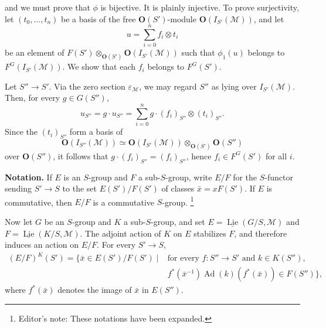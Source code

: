 and we must prove that \(\phi\) is bijective. It is plainly injective.
To prove surjectivity, let \((t_0,\ldots,t_n)\) be a basis of the free
\(\mathbf O(S')\)-module \(\mathbf O(I_{S'}(\mathscr M))\), and let
\[
 u=\sum_{i=0}^{n}f_i\otimes t_i
\]
be an element of
\(F(S')\otimes_{\mathbf O(S')}\mathbf O(I_{S'}(\mathscr M))\) such
that \(\phi_1(u)\) belongs to \(F^G(I_{S'}(\mathscr M))\). We show that
each \(f_i\) belongs to \(F^G(S')\).

Let \(S''\to S'\). Via the zero section \(\varepsilon_{\mathscr M}\),
we may regard \(S''\) as lying over \(I_{S'}(\mathscr M)\). Then, for
every \(g\in G(S'')\),
\[
 u_{S''}=g\cdot u_{S''}
   =\sum_{i=0}^{n}g\cdot(f_i)_{S''}\otimes(t_i)_{S''}.
\]
Since the \((t_i)_{S''}\) form a basis of
\[
 \mathbf O(I_{S''}(\mathscr M))
 \simeq \mathbf O(I_{S'}(\mathscr M))
        \otimes_{\mathbf O(S')}\mathbf O(S'')
\]
over \(\mathbf O(S'')\), it follows that
\(g\cdot(f_i)_{S''}=(f_i)_{S''}\), hence \(f_i\in F^G(S')\) for all
\(i\).

\medskip
\noindent\textbf{Notation.}
If \(E\) is an \(S\)-group and \(F\) a sub-\(S\)-group, write \(E/F\)
for the \(S\)-functor sending \(S'\to S\) to the set
\(E(S')/F(S')\) of classes \(\bar x=xF(S')\). If \(E\) is commutative,
then \(E/F\) is a commutative \(S\)-group.
\footnote{Editor's note: These notations have been expanded.}

Now let \(G\) be an \(S\)-group and \(K\) a sub-\(S\)-group, and set
\(E=\underline{\operatorname{Lie}}(G/S,\mathscr M)\) and
\(F=\underline{\operatorname{Lie}}(K/S,\mathscr M)\). The adjoint
action of \(K\) on \(E\) stabilizes \(F\), and therefore induces an
action on \(E/F\). For every \(S'\to S\),
\[
\begin{split}
 (E/F)^K(S')=\{\bar x\in E(S')/F(S')\mid{}&
  \text{for every }f:S''\to S'\text{ and }k\in K(S''),\\[-2pt]
 &f^*(\bar x^{-1})\operatorname{Ad}(k)(f^*(\bar x))\in F(S'')\},
\end{split}
\]
where \(f^*(\bar x)\) denotes the image of \(\bar x\) in \(E(S'')\).

